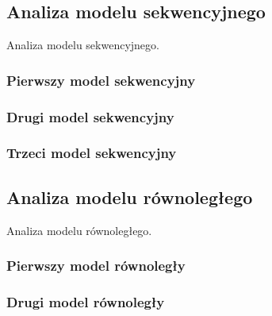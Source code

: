 \subsection{Analiza modelu sekwencyjnego}

Analiza modelu sekwencyjnego.

\subsubsection{Pierwszy model sekwencyjny}

\subsubsection{Drugi model sekwencyjny}

\subsubsection{Trzeci model sekwencyjny}

\subsection{Analiza modelu równoległego}

Analiza modelu równoległego.

\subsubsection{Pierwszy model równoległy}

\subsubsection{Drugi model równoległy}

